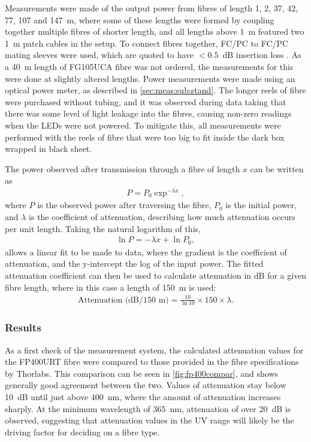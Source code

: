 \documentclass[a4paper,11pt]{article}
\begin{document}
Measurements were made of the output power from fibres of length 1, 2, 37, 42, 77, 107 and 147~m, where some of these lengths were formed by coupling together multiple fibres of shorter length, and all lengths above 1~m featured two 1~m patch cables in the setup. To connect fibres together, FC/PC to FC/PC mating sleeves were used, which are quoted to have $<0.5$~dB insertion loss \cite{bib:matingsleeve}. As a 40~m length of FG105UCA fibre was not ordered, the measurements for this were done at slightly altered lengths. Power measurements were made using an optical power meter, as described in \cref{sec:meas:sub:stand}. The longer reels of fibre were purchased without tubing, and it was observed during data taking that there was some level of light leakage into the fibres, causing non-zero readings when the LEDs were not powered. To mitigate this, all measurements were performed with the reels of fibre that were too big to fit inside the dark box wrapped in black sheet.

The power observed after transmission through a fibre of length $x$ can be written as
\begin{eqnarray}
P = P_0\exp^{-\lambda x},
\end{eqnarray}
where $P$ is the observed power after traversing the fibre, $P_0$ is the initial power, and $\lambda$ is the coefficient of attenuation, describing how much attenuation occurs per unit length. Taking the natural logarithm of this,
\begin{eqnarray}
\ln P = -\lambda x + \ln P_0,
\end{eqnarray}
allows a linear fit to be made to data, where the gradient is the coefficient of attenuation, and the y-intercept the log of the input power. The fitted attenuation coefficient can then be used to calculate attenuation in dB for a given fibre length, where in this case a length of 150~m is used:
\begin{eqnarray}
\text{Attenuation (dB/150~m)} = \frac{10}{\ln 10}\times 150 \times \lambda.
\end{eqnarray}

\subsubsection{Results}\label{sec:fibre:sub:att:sub:results}
As a first check of the measurement system, the calculated attenuation values for the FP400URT fibre were compared to those provided in the fibre specifications by Thorlabs. This comparison can be seen in \cref{fig:fp400compar}, and shows generally good agreement between the two. Values of attenuation stay below 10~dB until just above 400~nm, where the amount of attenuation increases sharply. At the minimum wavelength of 365~nm, attenuation of over 20~dB is observed, suggesting that attenuation values in the UV range will likely be the driving factor for deciding on a fibre type.
\end{document}
